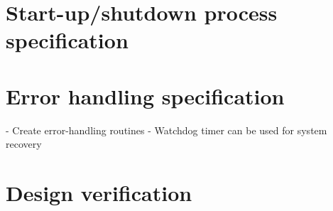 \section{Start-up/shutdown process specification}
\label{sec:startup-shutdown}
%
  \vspace{-5mm}
%  
\section{Error handling specification}
\label{sec:error-handling-specification}
- Create error-handling routines
- Watchdog timer can be used for system recovery
%
  \vspace{-5mm}
%  
\section{Design verification}
\label{sec:design-verification}
%
  \vspace{-5mm}
%  
